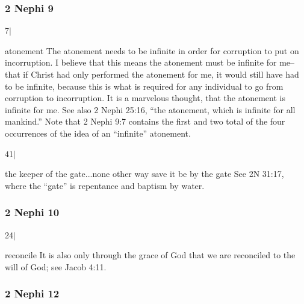 	\subsubsection{2 Nephi 9} %

		\begin{compactdesc}

		\item[7$\vert$]
		\begin{compactdesc}
		\item[atonement] The atonement needs to be infinite in order for corruption to put on incorruption. I believe that this means the atonement must be infinite for me--that if Christ had only performed the atonement for me, it would still have had to be infinite, because this is what is required for any individual to go from corruption to incorruption. It is a marvelous thought, that the atonement is infinite for me. See also 2 Nephi 25:16, ``the atonement, which is infinite for all mankind.'' Note that 2 Nephi 9:7 contains the first and two total of the four occurrences of the idea of an ``infinite'' atonement.
		\end{compactdesc}
		
		\item[41$\vert$]
		\begin{compactdesc}
		\item[the keeper of the gate...none other way save it be by the gate] See 2N 31:17, where the ``gate'' is repentance and baptism by water.
		\end{compactdesc}

		\end{compactdesc}

	\subsubsection{2 Nephi 10} %

		\begin{compactdesc}

		\item[24$\vert$]
		\begin{compactdesc}
		\item[reconcile] It is also only through the grace of God that we are reconciled to the will of God; see Jacob 4:11.
		\end{compactdesc}

		\end{compactdesc}

	\subsubsection{2 Nephi 12} %

